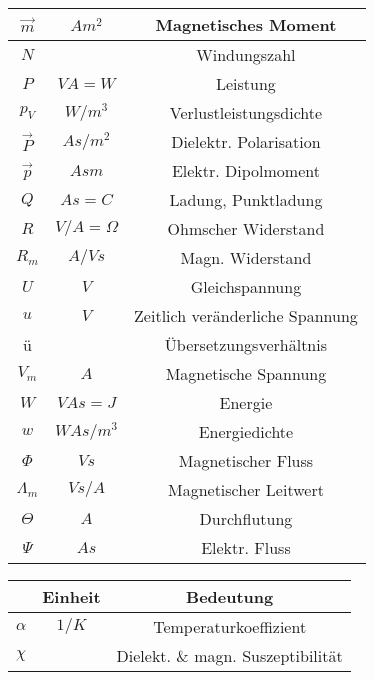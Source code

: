 \documentclass[a4paper, 11pt]{scrartcl}
\begin{document}
\begin{multicols*}{2}
\begin{center}
\begin{tabular}{|c|c|c|}
				\hline
				$\vec{m}$ & $Am^2$ & Magnetisches Moment \\
				\hline
				$N$ & & Windungszahl \\
				\hline
				$P$ & $VA=W$ & Leistung \\
				\hline
				$p_V$ & $W/m^3$ & Verlustleistungsdichte \\
				\hline
				$\vec{P}$ & $As/m^2$ & Dielektr. Polarisation \\
				\hline
				$\vec{p}$ & $Asm$ & Elektr. Dipolmoment \\
				\hline
				$Q$ & $As=C$ & Ladung, Punktladung \\
				\hline
				$R$ & $V/A=\Omega$ & Ohmscher Widerstand \\
				\hline
				$R_m$ & $A/Vs$ & Magn. Widerstand \\
				\hline
				$U$ & $V$ & Gleichspannung \\
				\hline
				$u$ & $V$ & Zeitlich veränderliche Spannung \\
				\hline
				ü & & Übersetzungsverhältnis \\
				\hline
				$V_m$ & $A$ & Magnetische Spannung \\
				\hline
				$W$ & $VAs=J$ & Energie \\
				\hline
				$w$ & $WAs/m^3$ & Energiedichte \\
				\hline
				$\Phi$ & $Vs$ & Magnetischer Fluss \\
				\hline
				$\Lambda_m$ & $Vs/A$ & Magnetischer Leitwert \\
				\hline
				$\Theta$ & $A$ & Durchflutung \\
				\hline
				$\Psi$ & $As$ & Elektr. Fluss \\
				\hline
				\end{tabular}
				\linebreak
\linebreak
\linebreak
\linebreak
\linebreak
\linebreak
\linebreak
\linebreak
\linebreak
				\begin{tabular}{|c|c|c|}
				\hline
				\textbf{} & \textbf{Einheit} & \textbf{Bedeutung} \\	
				\hline
				$\alpha$ & $1/K$ & Temperaturkoeffizient \\
				\hline
				$\chi$ & & Dielekt. \& magn. Suszeptibilität \\

\end{tabular}
\end{center}
\end{multicols*}
\end{document}
